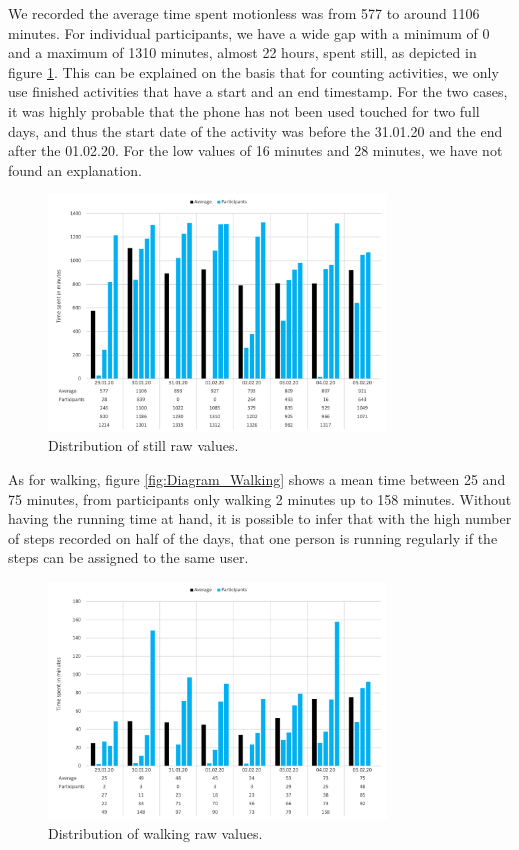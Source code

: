 
We recorded the average time spent motionless was from 577 to around 1106 minutes. For individual participants, we have a wide gap with a minimum of 0 and a maximum of 1310 minutes, almost 22 hours, spent still, as depicted in figure \ref{fig:diagram_still}. This can be explained on the basis that for counting activities, we only use finished activities that have a start and an end timestamp. For the two cases, it was highly probable that the phone has not been used touched for two full days, and thus the start date of the activity was before the 31.01.20 and the end after the 01.02.20. For the low values of 16 minutes and 28 minutes, we have not found an explanation. 

\begin{figure}[htbp]
  \centering
  \includegraphics[width=0.8\textwidth]{figures/diagram_still.png}
  \caption{Distribution of still raw values.} \label{fig:diagram_still}
\end{figure}

As for walking, figure \ref{fig:Diagram_Walking} shows a mean time between 25 and 75 minutes, from participants only walking 2 minutes up to 158 minutes. Without having the running time at hand, it is possible to infer that with the high number of steps recorded on half of the days, that one person is running regularly if the steps can be assigned to the same user.

\begin{figure}[htbp]
  \centering
  \includegraphics[width=0.8\textwidth]{figures/diagram_walking.png}
  \caption{Distribution of walking raw values.} \label{fig:diagram_walking}
\end{figure}

